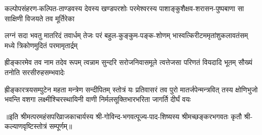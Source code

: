 \fourlineindentedshloka
{कल्पोपसंहरण-कल्पित-ताण्डवस्य}
{देवस्य खण्डपरशोः परमेश्वरस्य}
{पाशाङ्कुशैक्षव-शरासन-पुष्पबाणा}
{सा साक्षिणी विजयते तव मूर्तिरेका}%

\fourlineindentedshloka
{लग्नं सदा भवतु मातरिदं तवार्धम्}
{तेजः परं बहुल-कुङ्कुम-पङ्क-शोणम्}
{भास्वत्किरीटममृतांशुकलावतंसम्}
{मध्ये त्रिकोणमुदितं परमामृतार्द्रम्}%

\fourlineindentedshloka
{ह्रीङ्कारमेव तव नाम तदेव रूपम्}
{त्वन्नाम सुन्दरि सरोजनिवासमूले}
{त्वत्तेजसा परिणतं वियदादि भूतम्}
{सौख्यं तनोति सरसीरुहसम्भवादेः}%

\fourlineindentedshloka
{ह्रीङ्कारत्रयसम्पुटेन महता मन्त्रेण सन्दीपितम्}
{स्तोत्रं यः प्रतिवासरं तव पुरो मातर्जपेन्मन्त्रवित्}
{तस्य क्षोणिभुजो भवन्ति वशगा लक्ष्मीश्चिरस्थायिनी}
{वाणी निर्मलसूक्तिभारभरिता जागर्ति दीर्घं वयः}%
 
॥इति श्रीमत्परमहंसपरिव्राजकाचार्यस्य श्री-गोविन्द-भगवत्पूज्य-पाद-शिष्यस्य 
श्रीमच्छङ्करभगवतः कृतौ श्री-कल्याणवृष्टिस्तोत्रं  सम्पूर्णम्॥